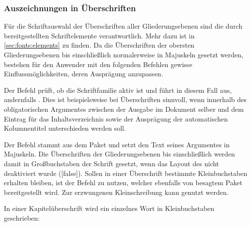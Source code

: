 \begin{Declaration*}{}
\begin{Declaration*}{}
\begin{Declaration*}{}
\subsubsection{Auszeichnungen in Überschriften}
%
%
Für die Schriftauswahl der Überschriften aller Gliederungsebenen sind die durch 
\KOMAScript{} bereitgestellten Schriftelemente verantwortlich. Mehr dazu ist in 
\autoref{sec:fonts:elements} zu finden. Da die Überschriften der obersten 
Gliederungsebenen bis einschließlich  normalerweise in 
Majuskeln gesetzt werden, bestehen für den Anwender mit den folgenden Befehlen 
gewisse Einflussmöglichkeiten, deren Ausprägung anzupassen.

\begin{Declaration}{}%
\printdeclarationlist%
%
%
%
%
Der Befehl  prüft, ob die Schriftfamilie \DIN aktiv ist und führt 
in diesem Fall  aus, andernfalls . 
Dies ist beispielsweise bei Überschriften sinnvoll, wenn innerhalb des 
obligatorischen Argumentes zwischen der Ausgabe im Dokument selber und dem 
Eintrag für das Inhaltsverzeichnis sowie der Ausprägung der automatischen 
Kolumnentitel unterschieden werden soll.
\end{Declaration}

\begin{Declaration}{}%
\begin{Declaration}{}%
\printdeclarationlist%
%
%
%
Der Befehl  stammt aus dem Paket  
und setzt den Text seines Argumentes in Majuskeln. Die Überschriften der 
Gliederungsebenen bis einschließlich  werden damit in 
Großbuchstaben der Schrift \DIN gesetzt, wenn das Layout des \CDs nicht 
deaktiviert wurde ([false]). Sollen in einer Überschrift bestimmte 
Kleinbuchstaben erhalten bleiben, ist der Befehl  zu 
nutzen, welcher ebenfalls von besagtem Paket bereitgestellt wird. Zur 
erzwungenen Kleinschreibung kann  genutzt werden.
\end{Declaration}
\end{Declaration}
%
\begin{Example}
In einer Kapitelüberschrift wird ein einzelnes Wort in Kleinbuchstaben 
geschrieben:
\begin{Code}[escapechar=§]

\end{Code}
\end{Example}
\end{Declaration*}
\end{Declaration*}
\end{Declaration*}
